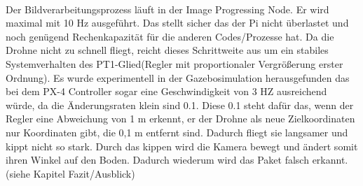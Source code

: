 \\
Der Bildverarbeitungsprozess läuft in der Image Progressing Node. Er wird maximal mit 10 Hz ausgeführt. Das stellt sicher das der Pi nicht überlastet und noch genügend Rechenkapazität für die anderen Codes/Prozesse hat. Da die Drohne nicht zu schnell fliegt, reicht dieses Schrittweite aus um ein stabiles Systemverhalten des PT1-Glied(Regler mit proportionaler Vergrößerung erster Ordnung). Es wurde experimentell in der Gazebosimulation herausgefunden das bei dem PX-4 Controller sogar eine Geschwindigkeit von 3 HZ ausreichend würde, da die Änderungsraten klein sind 0.1. Diese 0.1 steht dafür das, wenn der Regler eine Abweichung von 1 m erkennt, er der Drohne als neue Zielkoordinaten nur Koordinaten gibt, die 0,1 m entfernt sind. Dadurch fliegt sie langsamer und kippt nicht so stark. Durch das kippen wird die Kamera bewegt und ändert somit ihren Winkel auf den Boden. Dadurch wiederum wird das Paket falsch erkannt. (siehe Kapitel Fazit/Ausblick) 